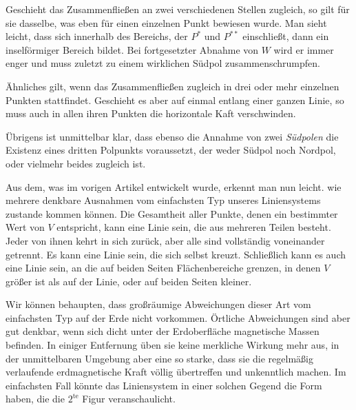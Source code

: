 Geschieht das Zusammenfließen an zwei verschiedenen Stellen zugleich, so gilt für sie dasselbe, was eben für einen einzelnen Punkt bewiesen wurde. Man sieht leicht, dass sich innerhalb des Bereichs, der $P^*$ und $P^{**}$ einschließt, dann ein inselförmiger Bereich bildet. Bei fortgesetzter Abnahme von $W$ wird er immer enger und muss zuletzt zu einem wirklichen Südpol zusammenschrumpfen.

Ähnliches gilt, wenn das Zusammenfließen zugleich in drei oder mehr einzelnen Punkten stattfindet. Geschieht es aber auf einmal entlang einer ganzen Linie, so muss auch in allen ihren Punkten die horizontale Kaft verschwinden.

Übrigens ist unmittelbar klar, dass ebenso die Annahme von zwei \textit{Südpolen} die Existenz eines dritten Polpunkts voraussetzt, der weder Südpol noch Nordpol, oder vielmehr beides zugleich ist.

Aus dem, was im vorigen Artikel entwickelt wurde, erkennt man nun leicht. wie mehrere denkbare Ausnahmen vom einfachsten Typ unseres Liniensystems zustande kommen können. Die Gesamtheit aller Punkte, denen ein bestimmter Wert von $V$ entspricht, kann eine Linie sein, die aus mehreren Teilen besteht. Jeder von ihnen kehrt in sich zurück, aber alle sind vollständig voneinander getrennt. Es kann eine Linie sein, die sich selbst kreuzt. Schließlich kann es auch eine Linie sein, an die auf beiden Seiten Flächenbereiche grenzen, in denen $V$ größer ist als auf der Linie, oder auf beiden Seiten kleiner.

Wir können behaupten, dass großräumige Abweichungen dieser Art vom einfachsten Typ auf der Erde nicht vorkommen. Örtliche Abweichungen sind aber gut denkbar, wenn sich dicht unter der Erdoberfläche magnetische Massen befinden. In einiger Entfernung üben sie keine merkliche Wirkung mehr aus, in der unmittelbaren Umgebung aber eine so starke, dass sie die regelmäßig verlaufende erdmagnetische Kraft völlig übertreffen und unkenntlich machen. Im einfachsten Fall könnte das Liniensystem in einer solchen Gegend die Form haben, die die $2^{\mathrm{te}}$ Figur veranschaulicht.

